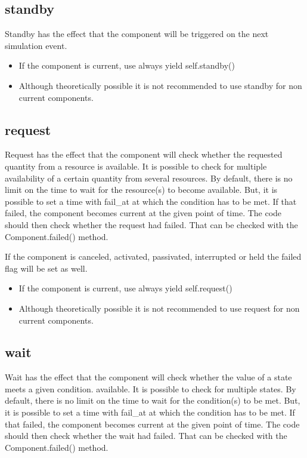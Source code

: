 \documentclass[letterpaper,10pt,english]{sphinxmanual}
\begin{document}
\subsection{standby}
\label{\detokenize{Component:standby}}
Standby has the effect that the component will be triggered on the next simulation event.
\begin{itemize}
\item {} 
If the component is current, use always yield self.standby()

\item {} 
Although theoretically possible it is not recommended to use standby for non current components.

\end{itemize}


\subsection{request}
\label{\detokenize{Component:request}}
Request has the effect that the component will check whether the requested quantity from a resource is available. It is
possible to check for multiple availability of a certain quantity from several resources.
By default, there is no limit on the time to wait for the resource(s) to become available. But, it is possible to set
a time with fail\_at at which the condition has to be met. If that failed, the component becomes current at the given point of time.
The code should then check whether the request had failed. That can be checked with the Component.failed() method.

If the component is canceled, activated, passivated, interrupted or held the failed flag will be set as well.
\begin{itemize}
\item {} 
If the component is current, use always yield self.request()

\item {} 
Although theoretically possible it is not recommended to use request for non current components.

\end{itemize}


\subsection{wait}
\label{\detokenize{Component:wait}}
Wait has the effect that the component will check whether the value of a state meets a given condition.
available. It is
possible to check for multiple states.
By default, there is no limit on the time to wait for the condition(s) to be met. But, it is possible to set
a time with fail\_at at which the condition has to be met. If that failed, the component becomes current at the given point of time.
The code should then check whether the wait had failed. That can be checked with the Component.failed() method.
\end{document}
